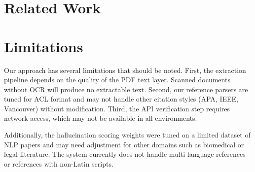 \documentclass[11pt]{article}
\begin{document}
\lipsum[39-42]

\section{Related Work}
\lipsum[43-46]

\section*{Limitations}

Our approach has several limitations that should be noted. First, the extraction pipeline depends on the quality of the PDF text layer. Scanned documents without OCR will produce no extractable text. Second, our reference parsers are tuned for ACL format and may not handle other citation styles (APA, IEEE, Vancouver) without modification. Third, the API verification step requires network access, which may not be available in all environments.

\lipsum[47-48]

Additionally, the hallucination scoring weights were tuned on a limited dataset of NLP papers and may need adjustment for other domains such as biomedical or legal literature. The system currently does not handle multi-language references or references with non-Latin scripts.

\lipsum[49-50]



\end{document}
